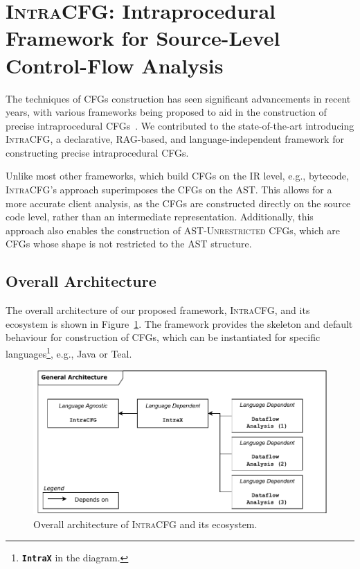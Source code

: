 \section{\textsc{IntraCFG}: Intraprocedural Framework for Source-Level Control-Flow Analysis}
\label{sec:IntraCFG}
The techniques of CFGs construction has seen significant advancements
in recent years, with various frameworks being proposed to aid in the construction 
of precise intraprocedural CFGs~\cite{smits2020flowspec,10.1016/j.scico.2012.02.002}.
We contributed to the state-of-the-art introducing \textsc{IntraCFG}, a declarative, RAG-based,
and language-independent framework for constructing precise intraprocedural CFGs.

Unlike most other frameworks, which build CFGs on the IR level,
e.g.,  bytecode, \textsc{IntraCFG}'s approach superimposes the CFGs 
on the AST. This allows for a more accurate client analysis,
as the CFGs are constructed directly on the source code level, rather than an
intermediate representation. Additionally, this approach also enables the construction 
of \textsc{AST-Unrestricted} CFGs, which are CFGs whose shape is not restricted to the AST structure.
\subsection{Overall Architecture}
The overall architecture of our proposed framework, \textsc{IntraCFG}, and its
ecosystem is shown in Figure~\ref{fig:intraCFG}. 
The framework provides the skeleton and default behaviour for construction of CFGs,
which can be instantiated for specific languages\footnote{\textbf{\texttt{IntraX}} in the diagram.}, e.g., Java or Teal. 
\begin{figure}[H]
    \centering
    \includegraphics[scale=0.7]{kappa/img/architecture.pdf}
    \caption{\label{fig:intraCFG} Overall architecture of \textsc{IntraCFG} and its ecosystem.}
\end{figure}


